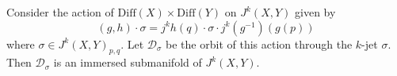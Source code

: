 Consider the action of $\mathrm{Diff}(X) \times \mathrm{Diff}(Y)$ on $J^k(X, Y)$ given by
$$(g, h) \cdot \sigma = j^k h(q) \cdot \sigma \cdot j^k(g^{-1})(g(p))$$
where $\sigma \in J^k(X, Y)_{p,q}$. Let $\mathcal{D}_\sigma$ be the orbit of this action through the $k$-jet $\sigma$. Then $\mathcal{D}_\sigma$ is an immersed submanifold of $J^k(X, Y)$.
